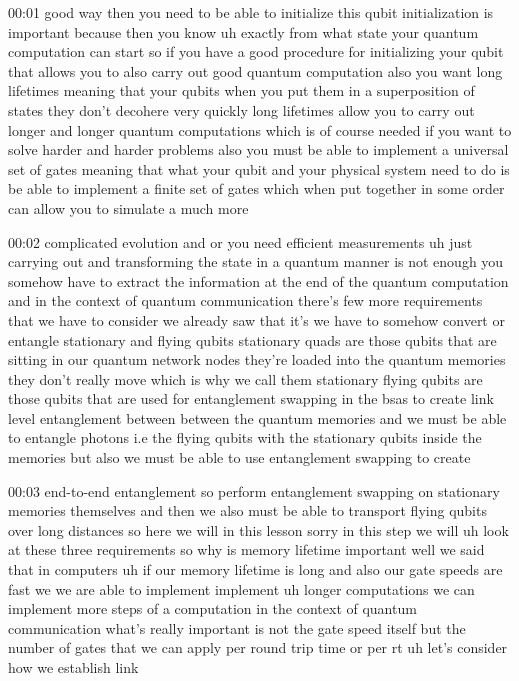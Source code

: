 00:01
good way then you need to be able to initialize this qubit initialization is
important because then you know uh exactly from what state your
quantum computation can start so if you have a good procedure for initializing
your qubit that allows you to also carry out good quantum computation
also you want long lifetimes meaning that your qubits when you put them in a
superposition of states they don't decohere very quickly long
lifetimes allow you to carry out longer and longer quantum computations
which is of course needed if you want to solve harder and harder problems
also you must be able to implement a universal set of gates
meaning that what your qubit and your physical system need to do
is be able to implement a finite set of gates which when put
together in some order can allow you to simulate a much more

00:02
complicated evolution and or you need efficient measurements uh
just carrying out and transforming the state in a quantum manner is not enough
you somehow have to extract the information at the end of the quantum
computation and in the context of quantum communication there's few more
requirements that we have to consider we already saw that it's we have to
somehow convert or entangle stationary and flying qubits stationary
quads are those qubits that are sitting in our
quantum network nodes they're loaded into the quantum memories
they don't really move which is why we call them stationary
flying qubits are those qubits that are used for
entanglement swapping in the bsas to create link level entanglement between
between the quantum memories and we must be able to
entangle photons i.e the flying qubits with the stationary qubits inside the
memories but also we must be able to use entanglement swapping to create

00:03
end-to-end entanglement so perform entanglement swapping on
stationary memories themselves and then we also must be able to
transport flying qubits over long distances
so here we will in this lesson sorry in this step we will uh
look at these three requirements so why is memory lifetime important well
we said that in computers uh if our memory lifetime is long and also our
gate speeds are fast we we are able to implement
implement uh longer computations we can implement more steps of a computation
in the context of quantum communication what's really important is not the gate
speed itself but the number of gates that we can apply
per round trip time or per rt uh let's consider how we establish link

